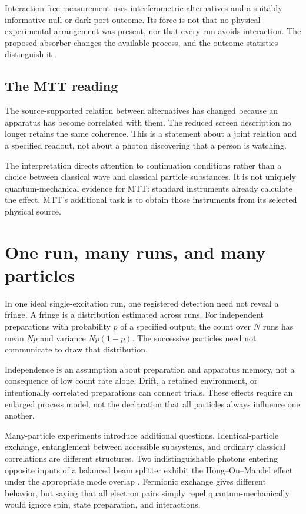 \documentclass[11pt,a4paper]{article}
\begin{document}
Interaction-free measurement uses interferometric alternatives and a suitably informative null or dark-port outcome. Its force is not that no physical experimental arrangement was present, nor that every run avoids interaction. The proposed absorber changes the available process, and the outcome statistics distinguish it \cite{ElitzurVaidman}.

\subsection{The MTT reading}
The source-supported relation between alternatives has changed because an apparatus has become correlated with them. The reduced screen description no longer retains the same coherence. This is a statement about a joint relation and a specified readout, not about a photon discovering that a person is watching.

The interpretation directs attention to continuation conditions rather than a choice between classical wave and classical particle substances. It is not uniquely quantum-mechanical evidence for MTT: standard instruments already calculate the effect. MTT's additional task is to obtain those instruments from its selected physical source.

\section{One run, many runs, and many particles}
\label{sec:number}
In one ideal single-excitation run, one registered detection need not reveal a fringe. A fringe is a distribution estimated across runs. For independent preparations with probability \(p\) of a specified output, the count over \(N\) runs has mean \(Np\) and variance \(Np(1-p)\). The successive particles need not communicate to draw that distribution.

Independence is an assumption about preparation and apparatus memory, not a consequence of low count rate alone. Drift, a retained environment, or intentionally correlated preparations can connect trials. These effects require an enlarged process model, not the declaration that all particles always influence one another.

Many-particle experiments introduce additional questions. Identical-particle exchange, entanglement between accessible subsystems, and ordinary classical correlations are different structures. Two indistinguishable photons entering opposite inputs of a balanced beam splitter exhibit the Hong--Ou--Mandel effect under the appropriate mode overlap \cite{HongOuMandel}. Fermionic exchange gives different behavior, but saying that all electron pairs simply repel quantum-mechanically would ignore spin, state preparation, and interactions.
\end{document}
